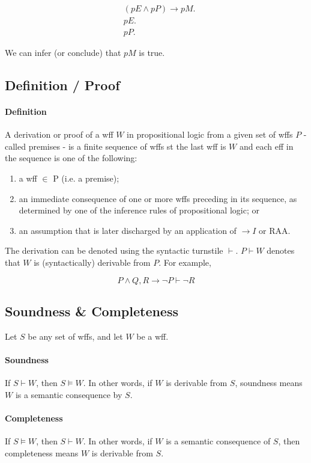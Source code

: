 \documentclass{article}
\theoremstyle{plain}
\theoremstyle{definition}
\begin{document}
\begin{multicols}{2}
\begin{align*}
& (pE \land pP) \rightarrow pM.\\
& pE.\\
& pP.
\end{align*}

We can infer (or conclude) that $pM$ is true. 


\subsection{Definition / Proof}

\paragraph{Definition} A derivation or proof of a wff $W$ in propositional logic from a given set of wffs $P$ - called premises - is a finite sequence of wffs st the last wff is $W$ and each eff in the sequence is one of the following:

\begin{enumerate}
\item a wff $\in$ P (i.e. a premise); 
\item an immediate consequence of one or more wffs preceding in its sequence, as determined by one of the inference rules of propositional logic; or
\item an assumption that is later discharged by an application of $\rightarrow I$ or RAA.
\end{enumerate}

The derivation can be denoted using the syntactic turnstile $\vdash$. $P \vdash W$ denotes that $W$ is (syntactically) derivable from $P$. For example, 

$$P \land Q, R \rightarrow \lnot P \vdash \lnot R$$

\subsection{Soundness \& Completeness}

Let $S$ be any set of wffs, and let $W$ be a wff.

\paragraph{Soundness} If $S \vdash W$, then $S \vDash W$. In other words, if $W$ is derivable from $S$, soundness means $W$ is a semantic consequence by $S$.

\paragraph{Completeness} If $S \vDash W$, then $S \vdash W$. In other words, if $W$ is a semantic consequence of $S$, then completeness means $W$ is derivable from $S$.


\end{multicols}
\end{document}

